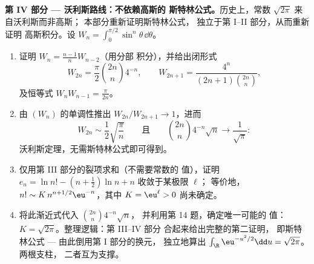 \begin{problem}
\medskip
\noindent\textbf{第 IV 部分 --- 沃利斯路线：不依赖高斯的
斯特林公式。}历史上，常数 $\sqrt{2\pi}$ 来自沃利斯而非高斯；
本部分重新证明斯特林公式，
独立于第 I--II 部分，从而重新证明
高斯积分。设 $W_n = \int_0^{\pi/2}\sin^n\theta\,
\dd\theta$。
\begin{enumerate}[resume]
  \item 证明 $W_n = \frac{n-1}nW_{n-2}$（用分部
        积分），并给出闭形式
        \[
        W_{2n} = \frac\pi2\binom{2n}n4^{-n}, \qquad
        W_{2n+1} = \frac{4^n}{(2n+1)\binom{2n}n},
        \]
        及恒等式 $W_nW_{n-1} = \frac\pi{2n}$。
  \item 由 $(W_n)$ 的单调性推出
        $W_{2n}/W_{2n+1} \to 1$，进而
        \[
        W_{2n} \sim \frac12\sqrt{\frac\pi n}
        \qquad\text{且}\qquad
        \binom{2n}n4^{-n}\sqrt n \longrightarrow
        \frac1{\sqrt\pi} :
        \]
        沃利斯定理，无需斯特林公式即可得到。
  \item 仅用第 III 部分的裂项求和（不需要常数的
        值），证明 $e_n = \ln n! - (n +
        \frac12)\ln n + n$ 收敛于某极限 $\ell$；
        等价地，$n! \sim K\,n^{n+1/2}\eu^{-n}$，其中 $K =
        \eu^\ell > 0$ 尚未确定。
  \item 将此渐近式代入 $\binom{2n}n4^{-n}\sqrt n$，
        并利用第 14 题，确定唯一可能的
        值：$K = \sqrt{2\pi}$。整理逻辑：第 III--IV 部分
        合起来给出完整的第二证明，
        即斯特林公式 --- 由此倒用第 I 部分的换元，
        独立地算出
        $\int_\R\eu^{-u^2/2}\dd u = \sqrt{2\pi}$。两根支柱，
        二者互为支撑。
\end{enumerate}


\end{problem}
